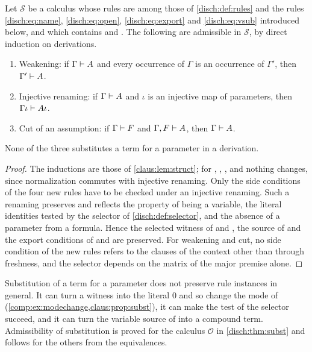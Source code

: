 \begin{lemma}
\label{disch:lem:structural}
Let $\mathcal S$ be a calculus whose rules are among those of
\cref{disch:def:rules} and the rules 
\eqref{disch:eq:name},  \eqref{disch:eq:open},
 \eqref{disch:eq:export} and 
\eqref{disch:eq:vsub} introduced below, and which contains 
and . The following are admissible in $\mathcal S$, by
direct induction on derivations.
\begin{enumerate}[label=\textup{(\alph*)}]
\item Weakening: if $\Gamma\vdash A$ and every occurrence of $\Gamma$ is
 an occurrence of $\Gamma'$, then $\Gamma'\vdash A$.
\item Injective renaming: if $\Gamma\vdash A$ and $\iota$ is an injective
 map of parameters, then $\Gamma\iota\vdash A\iota$.
\item Cut of an assumption: if $\Gamma\vdash F$ and $\Gamma,F\vdash A$,
 then $\Gamma\vdash A$.
\end{enumerate}
None of the three substitutes a term for a parameter in a derivation.
\end{lemma}

\begin{proof}
The inductions are those of \cref{claus:lem:struct}; for ,
, ,  and  nothing
changes, since normalization commutes with injective renaming. Only the
side conditions of the four new rules have to be checked under an
injective renaming. Such a renaming preserves and reflects the property of
being a variable, the literal identities tested by the selector of
\cref{disch:def:selector}, and the absence of a parameter from a formula.
Hence the selected witness of  and , the
source of  and the export conditions of  and
 are preserved. For weakening and cut, no side condition
of the new rules refers to the clauses of the context other than through
freshness, and the selector depends on the matrix of the major premise
alone.
\end{proof}

Substitution of a term for a parameter does not preserve rule instances in
general. It can turn a witness into the literal $0$ and so change the mode
of  (\cref{comp:ex:modechange,claus:prop:subst}), it can
make the test of the selector succeed, and it can turn the variable source
of  into a compound term. Admissibility of substitution is
proved for the calculus $\mathcal O$ in \cref{disch:thm:subst} and follows
for the others from the equivalences.

